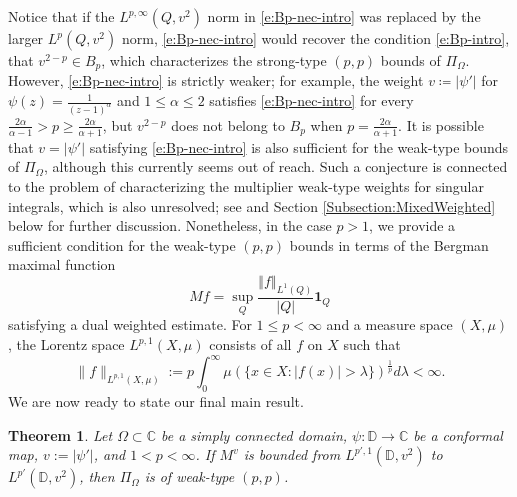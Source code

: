 \documentclass{amsart}
\newcommand{\norm}[1]{\left\Vert {#1}\right\Vert}
\newtheorem{theorem}{Theorem}[section]
\theoremstyle{definition}
\numberwithin{equation}{section}
\begin{document}
Notice that if the $L^{p,\infty}(Q,v^2)$ norm in \eqref{e:Bp-nec-intro} was replaced by the larger $L^p(Q,v^2)$ norm, \eqref{e:Bp-nec-intro} would recover the condition \eqref{e:Bp-intro}, that $v^{2-p} \in B_p$, which characterizes the strong-type $(p,p)$ bounds of $\Pi_{\Omega}$.
However, \eqref{e:Bp-nec-intro} is strictly weaker;
for example, the weight $v\coloneq |\psi'|$ for $\psi(z) = \frac{1}{(z-1)^\alpha}$ and $1\le \alpha \le 2$ satisfies \eqref{e:Bp-nec-intro} for every $\frac{2\alpha}{\alpha-1} > p \ge \frac{2\alpha}{\alpha+1}$, but $v^{2-p}$ does not belong to $B_p$ when $p= \frac{2\alpha}{\alpha+1}$. 
It is possible that $v=|\psi'|$ satisfying \eqref{e:Bp-nec-intro} is also sufficient for the weak-type bounds of $\Pi_{\Omega}$, although this currently seems out of reach. Such a conjecture is connected to the problem of characterizing the multiplier weak-type weights for singular integrals, which is also unresolved; see \cites{MW77,Saw85,Swe25} and Section \ref{Subsection:MixedWeighted} below for further discussion. 
Nonetheless, in the case $p>1$, we provide a sufficient condition for the weak-type $(p,p)$ bounds in terms of the Bergman maximal function 
	\[ M f = \sup_{Q} 
    \frac{\norm{f}_{L^1(Q)}}{|Q|} \mathbf 1_Q \]
satisfying a dual weighted estimate.
For $1 \leq p< \infty$ and a measure space $(X,\mu)$, the Lorentz space $L^{p,1}(X,\mu)$ consists of all $f$ on $X$ such that 
$$
    \|f\|_{L^{p,1}(X,\mu)} := p\int_0^{\infty} \mu(\{x \in X \colon |f(x)| > \lambda\})^\frac{1}{p} d\lambda < \infty.
$$
We are now ready to state our final main result.
\begin{theorem}\label{thm:Bp}
 Let $\Omega \subset \mathbb{C}$ be a simply connected domain, $\psi \colon \mathbb{D} \rightarrow \mathbb{C}$ be a conformal map, $v:= |\psi'|$, and $1< p< \infty$. If $M^v$ is bounded from $L^{p',1}(\mathbb{D}, v^2)$ to $L^{p'}(\mathbb{D},v^2)$, then $\Pi_{\Omega}$ is of weak-type $(p,p)$.
\end{theorem}
\end{document}
